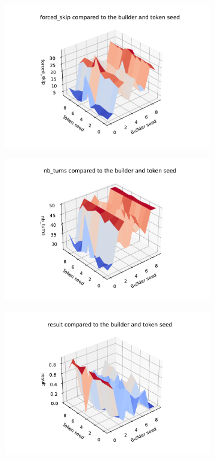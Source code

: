 \begin{figure}[H]
\begin{subfigure}[b]{0.3\textwidth}
    \end{subfigure} 
    \\
    \begin{subfigure}[b]{0.3\textwidth}
        \includegraphics[width=\textwidth]{img/skip.pdf}
    \end{subfigure}
    \begin{subfigure}[b]{0.3\textwidth}
        \includegraphics[width=\textwidth]{img/turns.pdf}
    \end{subfigure}
    \begin{subfigure}[b]{0.3\textwidth}
        \includegraphics[width=\textwidth]{img/result.pdf}

\end{subfigure}
\end{figure}

